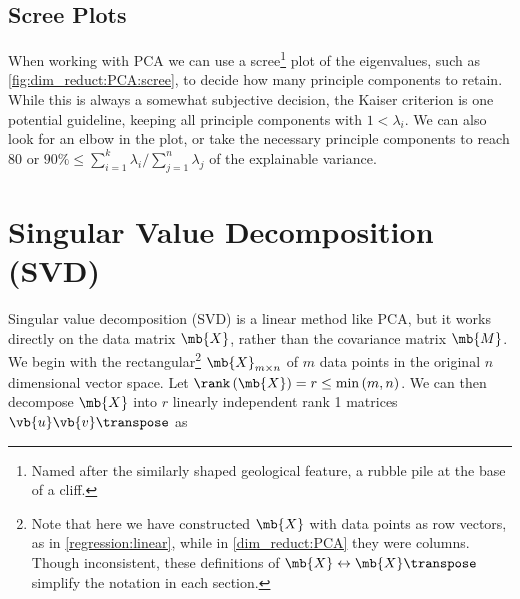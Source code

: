 \subsection{Scree Plots}
\label{dim_reduct:PCA:scree}

When working with PCA we can use a
scree\footnote{Named after the similarly shaped geological feature, a rubble pile at the base of a cliff.} plot \cite{scree}
of the eigenvalues, such as \cref{fig:dim_reduct:PCA:scree},
to decide how many principle components to retain.
While this is always a somewhat subjective decision,
the Kaiser criterion \cite{kaiser_criterion} is one potential guideline,
keeping all principle components with $1 < \lambda_{i}$.
We can also look for an elbow in the plot,
or take the necessary principle components to reach
\si{80}{\percent} or $\si{90}{\percent} \leq \sum_{i=1}^{k} \lambda_{i} / \sum_{j=1}^{n} \lambda_{j}$ of the explainable variance.

\section{Singular Value Decomposition (SVD)}
\label{dim_reduct:SVD}

Singular value decomposition (SVD) is a linear method like PCA,
but it works directly on the data matrix $\mb{X}$,
rather than the covariance matrix $\mb{M}$.
We begin with the rectangular\footnote{Note that here we have constructed $\mb{X}$
with data points as row vectors, as in \cref{regression:linear},
while in \cref{dim_reduct:PCA} they were columns.
Though inconsistent, these definitions of $\mb{X} \leftrightarrow \mb{X}\transpose$
simplify the notation in each section.} $\mb{X}_{m \times n}$
of $m$ data points in the original $n$ dimensional vector space.
Let $\rank\left(\mb{X}\right) = r \leq \min\left(m,n\right)$.
We can then decompose $\mb{X}$ into $r$ linearly independent
rank 1 matrices $\vb{u} \vb{v}\transpose$ as

